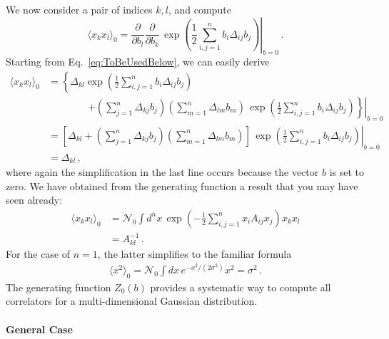 We now consider a pair of indices $k,l$, and compute
\begin{equation}
  \label{eq:GaussTwoPt}
  \langle x_k x_l \rangle_0 = 
  \frac{\partial}{\partial b_l} \frac{\partial}{\partial b_k} \,
  \left. \exp\left(
    \frac12 \sum_{i,j=1}^n b_i \Delta_{ij} b_j
  \right) \right|_{b=0} \, .
\end{equation}
Starting from Eq.~\ref{eq:ToBeUsedBelow}, we can easily derive
\begin{align}
  \langle x_k x_l \rangle_0 &= 
 \left\{
   \Delta_{kl} \exp\left(
     \frac12 \sum_{i,j=1}^n b_i \Delta_{ij} b_j
   \right)
 \right. 
\\
  & \quad\quad\quad\quad \left. \left. + \left(
     \sum_{j=1}^n \Delta_{kj} b_j
    \right)
    \left(
     \sum_{m=1}^n \Delta_{lm} b_m
    \right)\, 
    \exp\left(
    \frac12 \sum_{i,j=1}^n b_i \Delta_{ij} b_j
  \right)
    \right\} \right|_{b=0} \\
  &= \left.\left[ \Delta_{kl} + \left(
     \sum_{j=1}^n \Delta_{kj} b_j
    \right)
    \left(
     \sum_{m=1}^n \Delta_{lm} b_m
    \right)
    \right]\, 
\exp\left(
    \frac12 \sum_{i,j=1}^n b_i \Delta_{ij} b_j
  \right)
   \right|_{b=0} \\
  &= \Delta_{kl}\, ,
\end{align}
where again the simplification in the last line occurs because the vector $b$ is set to zero. We have obtained from the generating function a result that you may have seen already: 
\begin{align}
  \langle x_k x_l \rangle_0 &= 
  \mathcal{N}_0 \int d^nx\, \exp\left(
    -\frac12 \sum_{i,j=1}^n x_i A_{ij} x_j
    \right) x_k x_l \\
  &= A^{-1}_{kl}\, .
\end{align}
For the case of $n=1$, the latter simplifies to the familiar formula
\begin{align}
  \langle x^2 \rangle_0 = 
  \mathcal{N}_0 \int dx\, e^{-x^2/(2\sigma^2)} x^2 = \sigma^2\, .
\end{align}
The generating function $Z_0(b)$ provides a systematic way to compute all correlators for a multi-dimensional Gaussian distribution. 

\paragraph{General Case}

